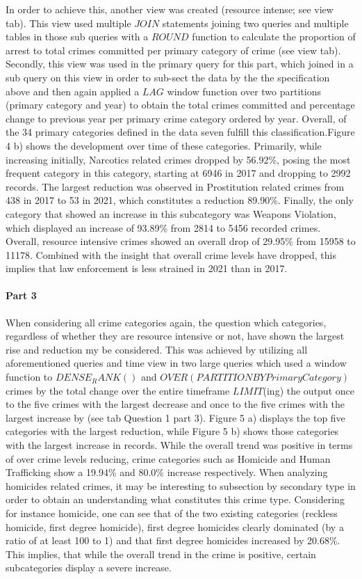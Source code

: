 \documentclass[a4paper]{article}
\begin{document}
In order to achieve this, another view was created (resource intense; see view tab). This view used multiple $JOIN$ statements joining two queries and multiple tables in those sub queries with a $ROUND$ function to calculate the proportion of arrest to total crimes committed per primary category of crime (see view tab). Secondly, this view was used in the primary query for this part, which joined in a sub query on this view in order to sub-sect the data by the the specification above and then again applied a $LAG$ window function over two partitions (primary category and year) to obtain the total crimes committed and percentage change to previous year per primary crime category ordered by year. Overall, of the 34 primary categories defined in the data seven fulfill this classification.Figure 4 b) shows the development over time of these categories. Primarily, while increasing initially, Narcotics related crimes dropped by 56.92\%, posing the most frequent category in this category, starting at 6946 in 2017 and dropping to 2992 records. The largest reduction was observed in Prostitution related crimes from 438 in 2017 to 53 in 2021, which constitutes a reduction 89.90\%. Finally, the only category that showed an increase in this subcategory was Weapons Violation, which displayed an increase of 93.89\% from 2814 to 5456 recorded crimes. Overall, resource intensive crimes showed an overall drop of 29.95\% from 15958 to 11178. Combined with the insight that overall crime levels have dropped, this implies that law enforcement is less strained in 2021 than in 2017. 



\paragraph{Part 3} When considering all crime categories again, the question which categories, regardless of whether they are resource intensive or not, have shown the largest rise and reduction my be considered. This was achieved by utilizing all aforementioned queries and time view in two large queries which used a window function to $DENSE_RANK()$ and $OVER(PARTITION BY PrimaryCategory)$ crimes by the total change over the entire timeframe $LIMIT$(ing) the output once to the five crimes with the largest decrease and once to the five crimes with the largest increase by  (see tab Question 1 part 3). Figure 5 a) displays the top five categories with the largest reduction, while Figure 5 b) shows those categories with the largest increase in records. While the overall trend was positive in terms of over crime levels reducing, crime categories such as Homicide and Human Trafficking show a 19.94\% and 80.0\% increase respectively. When analyzing homicides related crimes, it may be interesting to subsection by secondary type in order to obtain an understanding what constitutes this crime type. Considering for instance homicide, one can see that of the two existing categories (reckless homicide, first degree homicide), first degree homicides clearly dominated (by a ratio of at least 100 to 1) and that first degree homicides increased by 20.68\%. This implies, that while the overall trend in the crime is positive, certain subcategories display a severe increase.  
\end{document}
